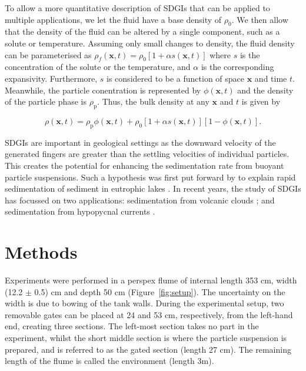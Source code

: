 \documentclass[authoryear,preprint,review,12pt]{elsarticle}
\begin{document}
To allow a more quantitative description of SDGIs that can be applied to multiple applications, we let the fluid have a base density of $\rho_{0}$. We then allow that the density of the fluid can be altered by a single component, such as a solute or temperature. Assuming only small changes to density, the fluid density can be parameterised as $\rho_{f}(\mathbf{x}, t) = \rho_{0} [1 + \alpha s(\mathbf{x}, t)]$ where $s$ is the concentration of the solute or the temperature, and $\alpha$ is the corresponding expansivity. Furthermore, $s$ is considered to be a function of space $\mathbf{x}$ and time $t$. Meanwhile, the particle conentration is represented by $\phi(\mathbf{x}, t)$ and the density of the particle phase is $\rho_{\text{p}}$. Thus, the bulk density at any $\mathbf{x}$ and $t$ is given by

\begin{equation}
  \label{equ:bulk_dens}
  \rho(\mathbf{x}, t) = \rho_{\text{p}} \phi(\mathbf{x}, t) + \rho_{0} [1 + \alpha s(\mathbf{x}, t)] [1 - \phi(\mathbf{x}, t)].
\end{equation}

SDGIs are important in geological settings as the downward velocity of the generated fingers are greater than the settling velocities of individual particles. This creates the potential for enhancing the sedimentation rate from buoyant particle suspensions. Such a hypothesis was first put forward by \citet{Bradley65} to explain rapid sedimentation of sediment in eutrophic lakes \citep{Nipkow20}. In recent years, the study of SDGIs has focussed on two applications: sedimentation from volcanic clouds \citep{Carrazo12, Manzella15, Scollo17}; and sedimentation from hypopycnal currents \citep{Chen97, Parsons01, Snyder11, Rouhnia15, Rouhnia17, Jazi16, Jazi19}.

\section{Methods}
\label{sec:method}

Experiments were performed in a perspex flume of internal length 353 cm, width (12.2 $\pm$ 0.5) cm and depth 50 cm (Figure~\ref{fig:setup}). The uncertainty on the width is due to bowing of the tank walls. During the experimental setup, two removable gates can be placed at 24 and 53 cm, respectively, from the left-hand end, creating three sections. The left-most section takes no part in the experiment, whilst the short middle section is where the particle suspension is prepared, and is referred to as the gated section (length 27 cm). The remaining length of the flume is called the environment (length 3m).
\end{document}
